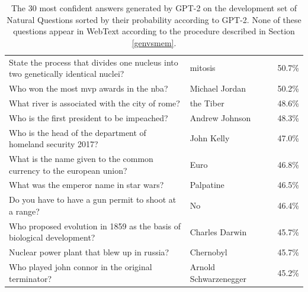 \documentclass{article}
\newcommand{\cmark}{\ding{51}}%
\newcommand{\xmark}{\ding{55}}%
\begin{document}
\begin{table}[t]
\begin{center}
\begin{scriptsize}
\begin{tabular}{llcc}
State the process that divides one nucleus into two genetically identical nuclei? & mitosis & \cmark & 50.7\% \\
Who won the most mvp awards in the nba? & Michael Jordan & \xmark & 50.2\% \\
What river is associated with the city of rome? & the Tiber & \cmark & 48.6\% \\
Who is the first president to be impeached? & Andrew Johnson & \cmark & 48.3\% \\
Who is the head of the department of homeland security 2017? & John Kelly & \cmark & 47.0\% \\
What is the name given to the common currency to the european union? & Euro & \cmark & 46.8\% \\
What was the emperor name in star wars? & Palpatine & \cmark & 46.5\% \\
Do you have to have a gun permit to shoot at a range? & No & \cmark & 46.4\% \\
Who proposed evolution in 1859 as the basis of biological development? & Charles Darwin & \cmark & 45.7\% \\
Nuclear power plant that blew up in russia? & Chernobyl & \cmark & 45.7\% \\
Who played john connor in the original terminator? & Arnold Schwarzenegger & \xmark & 45.2\% \\
\bottomrule
\end{tabular}
\end{scriptsize}
\caption{The 30 most confident answers generated by GPT-2 on the development set of Natural Questions sorted by their probability according to GPT-2. None of these questions appear in WebText according to the procedure described in Section \ref{genvsmem}.}
\label{genqa}
\end{center}
\vskip -0.1in
\end{table}
\end{document}
